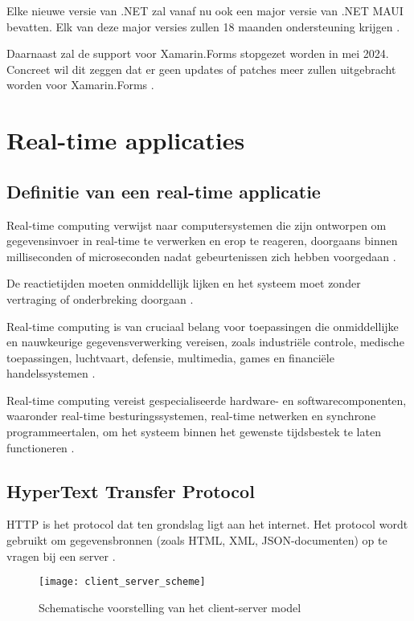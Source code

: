 Elke nieuwe versie van .NET zal vanaf nu ook een major versie van .NET MAUI bevatten. Elk van deze major versies zullen 18 maanden ondersteuning krijgen \autocite{Ramel2022}.

Daarnaast zal de support voor Xamarin.Forms stopgezet worden in mei 2024. Concreet wil dit zeggen dat er geen updates of patches meer zullen uitgebracht worden voor Xamarin.Forms \autocite{Ramel2022}.

\section{Real-time applicaties}
\subsection{Definitie van een real-time applicatie}
Real-time computing verwijst naar computersystemen die zijn ontworpen om gegevensinvoer in real-time te verwerken en erop te reageren, doorgaans binnen milliseconden of microseconden nadat gebeurtenissen zich hebben voorgedaan \autocite{Suse}. 

De reactietijden moeten onmiddellijk lijken en het systeem moet zonder vertraging of onderbreking doorgaan \autocite{Suse}. 

Real-time computing is van cruciaal belang voor toepassingen die onmiddellijke en nauwkeurige gegevensverwerking vereisen, zoals industriële controle, medische toepassingen, luchtvaart, defensie, multimedia, games en financiële handelssystemen \autocite{Suse}. 

Real-time computing vereist gespecialiseerde hardware- en softwarecomponenten, waaronder real-time besturingssystemen, real-time netwerken en synchrone programmeertalen, om het systeem binnen het gewenste tijdsbestek te laten functioneren \autocite{Suse}.

\subsection{HyperText Transfer Protocol}
HTTP is het protocol dat ten grondslag ligt aan het internet. Het protocol wordt gebruikt om gegevensbronnen (zoals HTML, XML, JSON-documenten) op te vragen bij een server \autocite{Cloudflare}.

\begin{figure}[H]
    \texttt{[image: client\_server\_scheme]}
    \centering
    \caption[Schematische voorstelling van het client-server model]{Schematische voorstelling van het client-server model \autocite{Combell}}
    \label{fig:clientServerScheme}
\end{figure}

